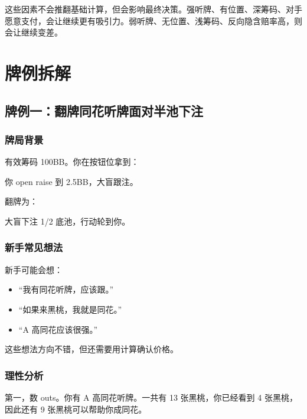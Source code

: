 这些因素不会推翻基础计算，但会影响最终决策。强听牌、有位置、深筹码、对手愿意支付，会让继续更有吸引力。弱听牌、无位置、浅筹码、反向隐含赔率高，则会让继续变差。

\section{牌例拆解}

\subsection{牌例一：翻牌同花听牌面对半池下注}

\subsubsection*{牌局背景}

有效筹码 100BB。你在按钮位拿到：

\begin{center}
\end{center}

你 open raise 到 2.5BB，大盲跟注。

翻牌为：

\begin{center}
\end{center}

大盲下注 1/2 底池，行动轮到你。

\subsubsection*{新手常见想法}

新手可能会想：

\begin{itemize}
\item “我有同花听牌，应该跟。”
\item “如果来黑桃，我就是同花。”
\item “A 高同花应该很强。”
\end{itemize}

这些想法方向不错，但还需要用计算确认价格。

\subsubsection*{理性分析}

第一，数 outs。你有 A 高同花听牌。一共有 13 张黑桃，你已经看到 4 张黑桃，因此还有 9 张黑桃可以帮助你成同花。

